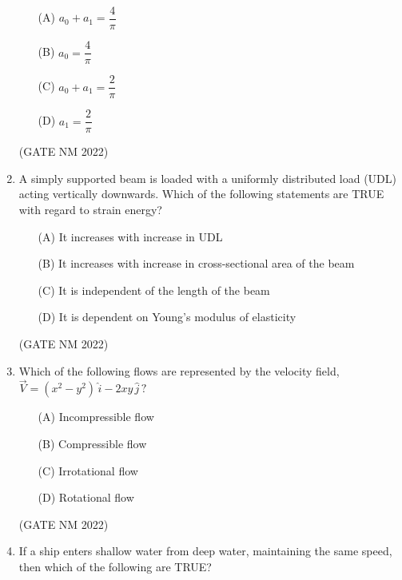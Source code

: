 \documentclass[journal,12pt,onecolumn]{IEEEtran}
\theoremstyle{remark}
\begin{document}
\begin{enumerate}
\begin{enumerate}
	\item [(A)] $a_0 + a_1 = \dfrac{4}{\pi}$
	\item  [(B)] $a_0 = \dfrac{4}{\pi}$
	\item [(C)]  $a_0 + a_1 = \dfrac{2}{\pi}$
	\item  [(D)] $a_1 = \dfrac{2}{\pi}$
\end{enumerate}

\hfill(GATE NM 2022)





\item  A simply supported beam is loaded with a uniformly distributed load (UDL) acting vertically downwards. Which of the following statements are TRUE with regard to strain energy?

\begin{enumerate}
	\item  [(A)] It increases with increase in UDL
	\item  [(B)] It increases with increase in cross-sectional area of the beam
	\item  [(C)] It is independent of the length of the beam
	\item  [(D)] It is dependent on Young's modulus of elasticity
\end{enumerate}

\hfill(GATE NM 2022)







\item  Which of the following flows are represented by the velocity field,  
$
\vec{V} = (x^2 - y^2)\,\hat{i} - 2xy\,\hat{j} \, ?
$

\begin{enumerate}
    \item[(A)] Incompressible flow
    \item[(B)] Compressible flow
    \item[(C)] Irrotational flow
    \item[(D)] Rotational flow
\end{enumerate}

\hfill(GATE NM 2022)




\item  If a ship enters shallow water from deep water, maintaining the same speed, then which of the following are TRUE?


\end{enumerate}
\end{document}
